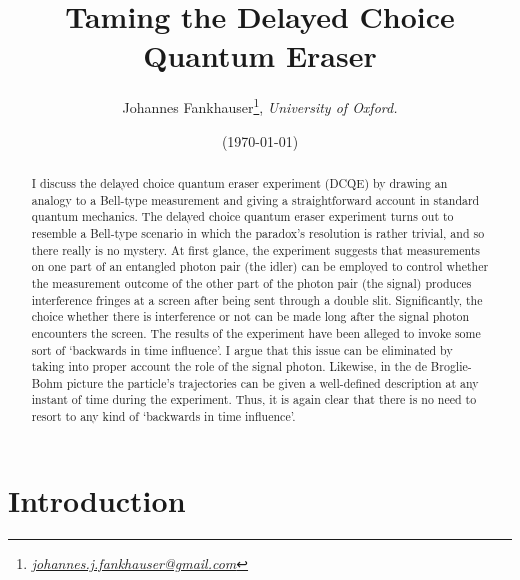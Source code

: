 \documentclass[12pt]{article}
\title{\textbf{Taming the Delayed Choice Quantum Eraser}}
\author[1]{Johannes Fankhauser\thanks{\href{mailto:johannes.j.fankhauser@gmail.com}{\it johannes.j.fankhauser@gmail.com}}, \it University of Oxford.}
\date{(\today)}                                             %
\numberwithin{equation}{section}
\begin{document}
\maketitle

\begin{abstract} 

I discuss the delayed choice quantum eraser experiment (DCQE) by drawing an analogy to a Bell-type measurement and giving a straightforward account in standard quantum mechanics. The delayed choice quantum eraser experiment turns out to resemble a Bell-type scenario in which the paradox's resolution is rather trivial, and so there really is no mystery.  At first glance, the experiment suggests that measurements on one part of an entangled photon pair (the idler) can be employed to control whether the measurement outcome of the other part of the photon pair (the signal) produces interference fringes at a screen after being sent through a double slit. Significantly, the choice whether there is interference or not can be made long after the signal photon encounters the screen. The results of the experiment have been alleged to invoke some sort of `backwards in time influence'. I argue that this issue can be eliminated by taking into proper account the role of the signal photon. Likewise, in the de Broglie-Bohm picture the particle's trajectories can be given a well-defined description at any instant of time during the experiment. Thus, it is again clear that there is no need to resort to any kind of `backwards in time influence'.  

 
\end{abstract}



\newpage

\section{Introduction}
\end{document}
